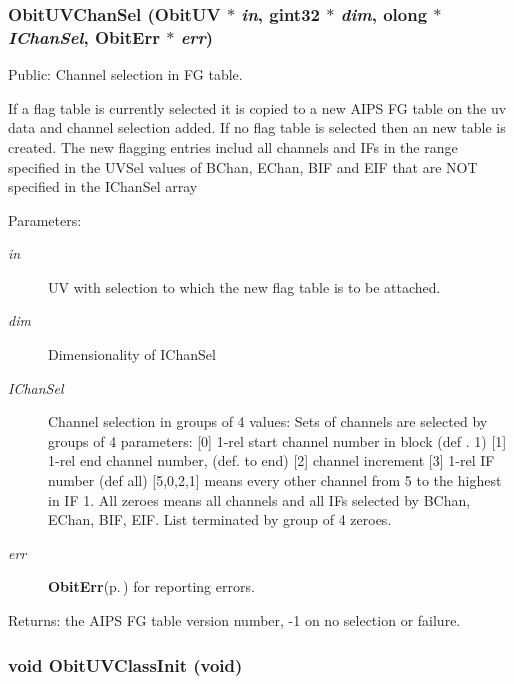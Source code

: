 \subsubsection{ Obit\-UVChan\-Sel ({\bf Obit\-UV} $\ast$ {\em in}, gint32 $\ast$ {\em dim}, {\bf olong} $\ast$ {\em IChan\-Sel}, {\bf Obit\-Err} $\ast$ {\em err})}\label{ObitUV_8h_a55}


Public: Channel selection in FG table. 

If a flag table is currently selected it is copied to a new AIPS FG table on the uv data and channel selection added. If no flag table is selected then an new table is created. The new flagging entries includ all channels and IFs in the range specified in the UVSel values of BChan, EChan, BIF and EIF that are NOT specified in the IChan\-Sel array \begin{Desc}
\item[Parameters:]
\begin{description}
\item[{\em in}]UV with selection to which the new flag table is to be attached. \item[{\em dim}]Dimensionality of IChan\-Sel \item[{\em IChan\-Sel}]Channel selection in groups of 4 values: Sets of channels are selected by groups of 4 parameters: [0] 1-rel start channel number in block (def . 1) [1] 1-rel end channel number, (def. to end) [2] channel increment [3] 1-rel IF number (def all) [5,0,2,1] means every other channel from 5 to the highest in IF 1. All zeroes means all channels and all IFs selected by BChan, EChan, BIF, EIF. List terminated by group of 4 zeroes. \item[{\em err}]{\bf Obit\-Err}{\rm (p.\,\pageref{structObitErr})} for reporting errors. \end{description}
\end{Desc}
\begin{Desc}
\item[Returns:]the AIPS FG table version number, -1 on no selection or failure. \end{Desc}
\subsubsection{\setlength{\rightskip}{0pt plus 5cm}void Obit\-UVClass\-Init (void)}\label{ObitUV_8h_a23}


